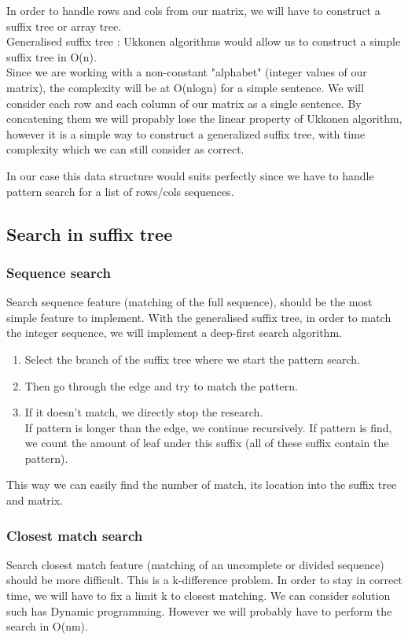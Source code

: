 \par
In order to handle rows and cols from our matrix, we will have to construct a suffix tree or array tree.\\
Generalised suffix tree : Ukkonen algorithms would allow us to construct a simple suffix tree in O(n).\\
Since we are working with a non-constant "alphabet" (integer values of our matrix), the complexity will be at O(nlogn)
for a simple sentence. We will consider each row and each column of our matrix as a single sentence. By concatening them we will propably lose the linear property of Ukkonen algorithm, however it is a simple way to construct a generalized suffix tree, with time complexity which we can still consider as correct.\\

\par
In our case this data structure would suits perfectly since we have to handle pattern search for a list of rows/cols sequences.

\subsection{Search in suffix tree}

\subsubsection{Sequence search}
\par
Search sequence feature (matching of the full sequence), should be the most simple feature to implement.
With the generalised suffix tree, in order to match the integer sequence, we will implement a deep-first search algorithm.
\begin{enumerate}
	\item Select the branch of the suffix tree where we start the pattern search.
	\item Then go through the edge and try to match the pattern.
	\item If it doesn't match, we directly stop the research.\\
	If pattern is longer than the edge, we continue recursively.
	If pattern is find, we count the amount of leaf under this suffix (all of these suffix contain the pattern).
\end{enumerate}
This way we can easily find the number of match, its location into the suffix tree and matrix.
\bigskip

\subsubsection{Closest match search}
\par
Search closest match feature (matching of an uncomplete or divided sequence) should be more difficult. This is a k-difference problem. In order to stay in correct time, we will have to fix a limit k to closest matching.
We can consider solution such has Dynamic programming. However we will probably have to perform the search in O(nm).

